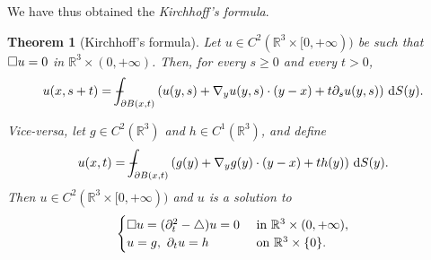 \documentclass[a4paper,9pt]{amsart}
\newcommand{\R}{\mathbb{R}}	%
\newcommand{\did}{\,\mathrm{d}}	%
\newcommand{\de}{\partial}		%
\newcommand{\laplacian}{\triangle}
\newcommand{\grad}{\nabla}
\def\Xint#1{\mathchoice
      {\XXint\displaystyle\textstyle{#1}}%
      {\XXint\textstyle\scriptstyle{#1}}%
      {\XXint\scriptstyle\scriptscriptstyle{#1}}%
      {\XXint\scriptscriptstyle\scriptscriptstyle{#1}}%
      \!\int}
\def\XXint#1#2#3{{\setbox0=\hbox{$#1{#2#3}{\int}$}
        \vcenter{\hbox{$#2#3$}}\kern-.5\wd0}}
\def\fint{\Xint-}
\theoremstyle{plain}
\newtheorem{theorem}[proposition]{Theorem}
\theoremstyle{definition}
\theoremstyle{remark}
\begin{document}
We have thus obtained the \emph{Kirchhoff's formula}.

\begin{theorem}[Kirchhoff's formula]\label{thm67ce9378}
	Let $u\in C^2(\R^3\times[0,+\infty))$ be such that $\square u =0$ in $\R^3\times(0,+\infty)$.
	Then, for every $s\ge 0$ and every $t>0$,
	\begin{equation}\label{eq67ce93f5}
		u(x,s+t) = \fint_{\de B(x,t)} \left( u(y,s) + \grad_yu(y,s) \cdot (y-x) + t \de_s u(y,s) \right) \did S(y) .
	\end{equation}
	
	Vice-versa, let $g\in C^2(\R^3)$ and $h\in C^1(\R^3)$, and define
	\begin{equation}\label{eq67d7f537}
		u(x,t) = \fint_{\de B(x,t)} \left( g(y) + \grad_yg(y) \cdot (y-x) + t h(y) \right) \did S(y) .
	\end{equation}
	Then $u\in C^2(\R^3\times[0,+\infty))$ and $u$ is a solution to 
	\begin{equation}\label{eq67d7f53c}
	\begin{cases}
		\waveop u = ( \de_t^2-\laplacian )u = 0 & \text{ in }\R^3\times(0,+\infty) , \\
		u = g,\ \de_t u = h & \text{ on }\R^3\times\{0\} .
	\end{cases}
	\end{equation}
\end{theorem}
\end{document}
